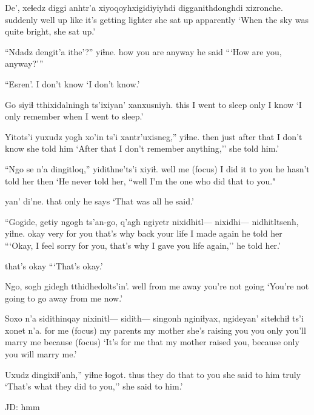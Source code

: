 \documentclass[12pt]{article}
\begin{document}
\gll De',      xeɬedz diggi anhtr'a xiyoqoyhxigidiyiyhdi         digganithdonghdi xizronche.
suddenly well   up    like         {it's getting lighter} {she sat up}   apparently
\glt `When the sky was quite bright, she sat up.'  
\glend

\gll ``Ndadz dengit'a ithe'?''   yiɬne.
how   {you are} anyway  he said
\glt ```How are you, anyway?'''
\glend

\gll ``Esren'.
{{I don't know}}
\glt `I don't know.'
\glend

\gll Go   {siyiɬ tthixidalningh} ts'ixiyan' xanxusniyh.
this {I went to sleep}      only       {I know}
\glt `I only remember when I went to sleep.'
\glend

\gll Yitots'i yuxudz {yogh xo'in}    ts'i xantr'uxisneg,'' yiɬne.
then     just   {after that} {}  {I don't know} {she told him}
\glt `After that I don't remember anything,'' she told him.'                
\glend

\gll ``Ngo  se n'a dingitloq,''       yidithne'ts'i xiyiɬ.     
well me {(focus)}    {I did it to you} {he hasn't told her}  then
\glt `He never told her, ``well I'm the one who did that to you." 
\glend

 yan' di'ne.
 that only {he says}
\glt `That was all he said.'
\glend

\gll ``Gogide, getiy ngogh    ts'an-go,    q'agh ngiyetr nixidhitl--- nixidhi---  nidhitltsenh, yiɬne.
okay    very  {for you} {that's why} back  {your life} {} {} {I made again} {he told her}
\glt ```Okay, I feel sorry for you, that's why I gave you life again,'' he told her.'
\glend

{{that's okay}}
\glt ```That's okay.'
\glend

\gll Ngo, sogh    gidegh {tthidhedolts'in'}.
well {from me} away   {you're not going}
\glt `You're not going to go away from me now.'
\glend

\gll Soxo   n'a sidithinqay nixinitl--- sidith--- singonh   nginiɬyax, ngideyan' siteɬchiɬ       ts'i xonet n'a.
{for me} {(focus)} {my parents} {}  {}         {my mother} {she's raising you  } {you only} {you'll marry me}  {}  {because} {(focus)}
\glt `It's for me that my mother raised you, because only you will marry me.'
\glend

\gll Uxudz dingixiɬ'anh,''        yiɬne           ɬogot.
thus  {they do that to you} {she said to him} truly
\glt `That's what they did to you,'' she said to him.'
\glend

JD:  hmm
\end{document}
